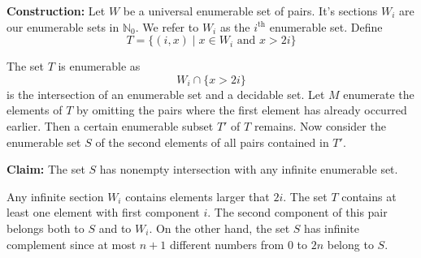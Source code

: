 \documentclass[10pt, letterpaper]{article}
\newcommand{\N}{\mathbb{N}}
\theoremstyle{remark}
\theoremstyle{definition}
\begin{document}
    \textbf{Construction: } Let $W$ be a universal enumerable set of pairs. It's sections $W_i$ are our enumerable sets in 
    $\N_0$. We refer to $W_i$ as the $i^{\text{th}}$ enumerable set. Define 
    \[
        T = \{(i,x) \mid x \in W_i \text{ and } x > 2i\}
    \]

    The set $T$ is enumerable as 
    \[
        W_i \cap \{x > 2i \}
    \]
    is the intersection of an enumerable set and a decidable set. Let $M$ enumerate the elements of $T$ by omitting the 
    pairs where the first element has already occurred earlier. Then a certain enumerable subset $T'$ of $T$ remains. Now consider 
    the enumerable set $S$ of the second elements of all pairs contained in $T'$.

    \textbf{Claim: } The set $S$ has nonempty intersection with any infinite enumerable set. 

    Any infinite section $W_i$ contains elements larger that $2i$. The set $T$ contains at least one element with first 
    component $i$. The second component of this pair belongs both to $S$ and to $W_i$. On the other hand, the set $S$ has 
    infinite complement since at most $n+1$ different numbers from 0 to $2n$ belong to $S$.
\end{document}
